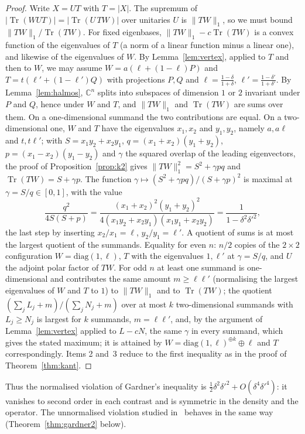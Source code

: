 \documentclass[11pt]{article}
\DeclareMathOperator{\Tr}{Tr}
\newcommand{\C}{\mathbb{C}}
\theoremstyle{plain}
\theoremstyle{definition}
\theoremstyle{remark}
\begin{document}
\begin{proof}
Write $X=UT$ with $T=|X|$. The supremum of $|\Tr(WUT)|=|\Tr(U\,TW)|$ over unitaries $U$ is $\|TW\|_1$, so we must bound
$\|TW\|_1/\Tr(TW)$. For fixed eigenbases, $\|TW\|_1-c\Tr(TW)$ is a convex function of the eigenvalues of $T$ (a norm of a
linear function minus a linear one), and likewise of the eigenvalues of $W$. By Lemma~\ref{lem:vertex}, applied to $T$ and
then to $W$, we may assume $W=a(\ell+(1-\ell)P)$ and $T=t(\ell'+(1-\ell')Q)$ with projections $P,Q$ and $\ell=\frac{1-\delta}{1+\delta}$,
$\ell'=\frac{1-\delta'}{1+\delta'}$. By Lemma~\ref{lem:halmos}, $\C^n$ splits into subspaces of dimension $1$ or $2$ invariant
under $P$ and $Q$, hence under $W$ and $T$, and $\|TW\|_1$ and $\Tr(TW)$ are sums over them. On a one-dimensional summand the
two contributions are equal. On a two-dimensional one, $W$ and $T$ have the eigenvalues $x_1,x_2$ and $y_1,y_2$, namely
$a,a\ell$ and $t,t\ell'$; with $S=x_1y_2+x_2y_1$, $q=(x_1+x_2)(y_1+y_2)$, $p=(x_1-x_2)(y_1-y_2)$ and $\gamma$ the squared overlap
of the leading eigenvectors, the proof of Proposition~\ref{prop:k2} gives $\|TW\|_1^2=S^2+\gamma pq$ and $\Tr(TW)=S+\gamma p$.
The function $\gamma\mapsto(S^2+\gamma pq)/(S+\gamma p)^2$ is maximal at $\gamma=S/q\in[0,1]$, with the value
\[
  \frac{q^2}{4S(S+p)}=\frac{(x_1+x_2)^2(y_1+y_2)^2}{4(x_1y_2+x_2y_1)(x_1y_1+x_2y_2)}=\frac1{1-\delta^2\delta'^2},
\]
the last step by inserting $x_2/x_1=\ell$, $y_2/y_1=\ell'$. A quotient of sums is at most the largest quotient of the
summands. Equality for even $n$: $n/2$ copies of the $2\times2$ configuration $W=\mathrm{diag}(1,\ell)$, $T$ with the
eigenvalues $1,\ell'$ at $\gamma=S/q$, and $U$ the adjoint polar factor of $TW$. For odd $n$ at least one summand is
one-dimensional and contributes the same amount $m\ge\ell\ell'$ (normalising the largest eigenvalues of $W$ and $T$ to
$1$) to $\|TW\|_1$ and to $\Tr(TW)$; the quotient $(\sum_jL_j+m)/(\sum_jN_j+m)$ over at most $k$ two-dimensional summands
with $L_j\ge N_j$ is largest for $k$ summands, $m=\ell\ell'$, and, by the argument of Lemma~\ref{lem:vertex} applied to
$L-cN$, the same $\gamma$ in every summand, which gives the stated maximum; it is attained by
$W=\mathrm{diag}(1,\ell)^{\oplus k}\oplus\ell$ and $T$ correspondingly. Items 2 and~3 reduce to the first inequality as in
the proof of Theorem~\ref{thm:kant}.
\end{proof}

\noindent Thus the normalised violation of Gardner's inequality is $\frac12\delta^2\delta'^2+O(\delta^4\delta'^4)$: it
vanishes to second order in each contrast and is symmetric in the density and the operator. The unnormalised violation
studied in~\cite{abed2024} behaves in the same way (Theorem~\ref{thm:gardner2} below).
\end{document}
